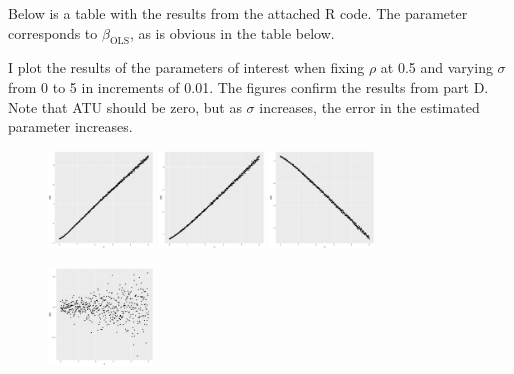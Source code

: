 \documentclass{article}
\begin{document}
\begin{solution}
    
Below is a table with the results from the attached R code. The parameter corresponds to $\beta_\text{OLS}$, as is obvious in the table below.


I plot the results of the parameters of interest when fixing $\rho$ at 0.5 and varying $\sigma$ from 0 to 5 in increments of 0.01. The figures confirm the results from part D. Note that ATU should be zero, but as $\sigma$ increases, the error in the estimated parameter increases.

\begin{figure}[!htb]
    \centering
    \includegraphics[width=0.25\textwidth]{ps1/Figures/p2_qe_beta.pdf}
    \includegraphics[width=0.25\textwidth]{ps1/Figures/p2_qe_ATT.pdf}
    \includegraphics[width=0.25\textwidth]{ps1/Figures/p2_qe_ATU.pdf}
\end{figure}
\begin{figure}[!htb]
    \centering    
    \includegraphics[width=0.25\textwidth]{ps1/Figures/p2_qe_ATE.pdf}
\end{figure}

\end{solution}
\end{document}
